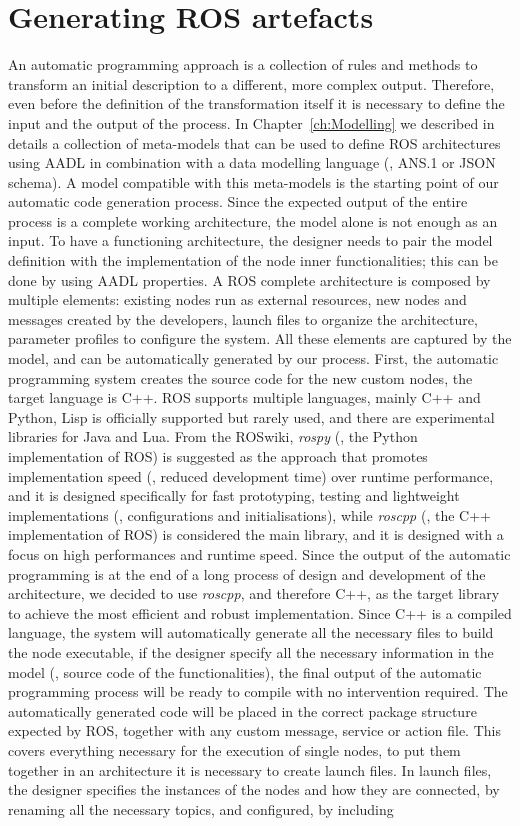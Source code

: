 \section{Generating ROS artefacts}
An automatic programming approach is a collection of rules and methods to transform an initial description to a different, more complex output. Therefore, even before the definition of the transformation itself it is necessary to define the input and the output of the process. In Chapter~\ref{ch:Modelling} we described in details a collection of meta-models that can be used to define ROS architectures using AADL in combination with a data modelling language (\ie, ANS.1 or JSON schema). A model compatible with this meta-models is the starting point of our automatic code generation process. Since the expected output of the entire process is a complete working architecture, the model alone is not enough as an input. To have a functioning architecture, the designer needs to pair the model definition with the implementation of the node inner functionalities; this can be done by using AADL properties. A ROS complete architecture is composed by multiple elements: existing nodes run as external resources, new nodes and messages created by the developers, launch files to organize the architecture, parameter profiles to configure the system. All these elements are  captured by the model, and can be automatically generated by our process. First, the automatic programming system creates the source code for the new custom nodes, the target language is C++. ROS supports multiple languages, mainly C++ and Python, Lisp is officially supported but rarely used, and there are experimental libraries for Java and Lua. From the ROSwiki, \textit{rospy} (\ie, the Python implementation of ROS) is suggested as the approach that promotes implementation speed (\ie, reduced development time) over runtime performance, and it is designed specifically for fast prototyping, testing and lightweight implementations (\eg, configurations and initialisations), while \textit{roscpp} (\ie, the C++ implementation of ROS) is considered the main library, and it is designed with a focus on high performances and runtime speed. Since the output of the automatic programming is at the end of a long process of design and development of the architecture, we decided to use \textit{roscpp}, and therefore C++, as the target library to achieve the most efficient and robust implementation. Since C++ is a compiled language, the system will automatically generate all the necessary files to build the node executable, if the designer specify all the necessary information in the model (\ie, source code of the functionalities), the final output of the automatic programming process will be ready to compile with no intervention required. The automatically generated code will be placed in the correct package structure expected by ROS, together with any custom message, service or action file. This covers everything necessary for the execution of single nodes, to put them together in an architecture it is necessary to create launch files. In launch files, the designer specifies the instances of the nodes and how they are connected, by renaming all the necessary topics, and configured, by including 